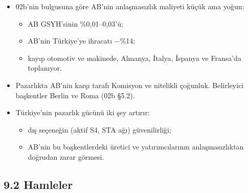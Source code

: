 \begin{itemize}
\tightlist
\item
  02b'nin bulgusuna göre AB'nin anlaşmasızlık maliyeti küçük ama yoğun:

  \begin{itemize}
  \tightlist
  \item
    AB GSYH'sinin \%0,01--0,03'ü;
  \item
    AB'nin Türkiye'ye ihracatı −\%14;
  \item
    kayıp otomotiv ve makinede, Almanya, İtalya, İspanya ve Fransa'da toplanıyor.
  \end{itemize}
\item
  Pazarlıkta AB'nin karşı tarafı Komisyon ve nitelikli çoğunluk. Belirleyici başkentler Berlin ve Roma (02b §5.2).
\item
  Türkiye'nin pazarlık gücünü iki şey artırır:

  \begin{itemize}
  \tightlist
  \item
    dış seçeneğin (aktif S4, STA ağı) güvenilirliği;
  \item
    AB'nin bu başkentlerdeki üretici ve yatırımcılarının anlaşmasızlıktan doğrudan zarar görmesi.
  \end{itemize}
\end{itemize}

\hypertarget{02c_hazirlik-92-hamleler}{%
\subsection{9.2 Hamleler}\label{02c_hazirlik-92-hamleler}}

\begingroup\gbtablo\small

